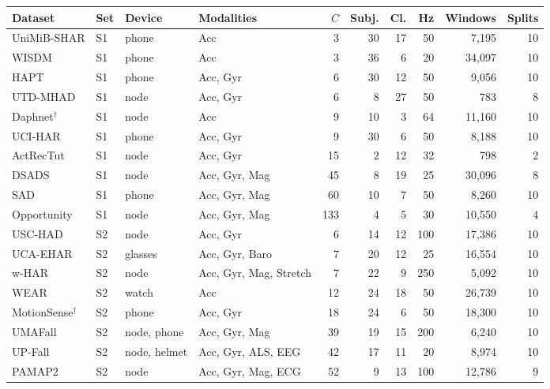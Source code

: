 \begin{tabular}{@{}llllrrrrrr@{}}
\toprule
Dataset & Set & Device & Modalities & $C$ & Subj. & Cl. & Hz & Windows & Splits \\
\midrule
UniMiB-SHAR & S1 & phone & Acc & 3 & 30 & 17 & 50 & 7,195 & 10 \\
WISDM & S1 & phone & Acc & 3 & 36 & 6 & 20 & 34,097 & 10 \\
HAPT & S1 & phone & Acc, Gyr & 6 & 30 & 12 & 50 & 9,056 & 10 \\
UTD-MHAD & S1 & node & Acc, Gyr & 6 & 8 & 27 & 50 & 783 & 8 \\
Daphnet$^\dagger$ & S1 & node & Acc & 9 & 10 & 3 & 64 & 11,160 & 10 \\
UCI-HAR & S1 & phone & Acc, Gyr & 9 & 30 & 6 & 50 & 8,188 & 10 \\
ActRecTut & S1 & node & Acc, Gyr & 15 & 2 & 12 & 32 & 798 & 2 \\
DSADS & S1 & node & Acc, Gyr, Mag & 45 & 8 & 19 & 25 & 30,096 & 8 \\
SAD & S1 & phone & Acc, Gyr, Mag & 60 & 10 & 7 & 50 & 8,260 & 10 \\
Opportunity & S1 & node & Acc, Gyr, Mag & 133 & 4 & 5 & 30 & 10,550 & 4 \\
\midrule
USC-HAD & S2 & node & Acc, Gyr & 6 & 14 & 12 & 100 & 17,386 & 10 \\
UCA-EHAR & S2 & glasses & Acc, Gyr, Baro & 7 & 20 & 12 & 25 & 16,554 & 10 \\
w-HAR & S2 & node & Acc, Gyr, Mag, Stretch & 7 & 22 & 9 & 250 & 5,092 & 10 \\
WEAR & S2 & watch & Acc & 12 & 24 & 18 & 50 & 26,739 & 10 \\
MotionSense$^\dagger$ & S2 & phone & Acc, Gyr & 18 & 24 & 6 & 50 & 18,300 & 10 \\
UMAFall & S2 & node, phone & Acc, Gyr, Mag & 39 & 19 & 15 & 200 & 6,240 & 10 \\
UP-Fall & S2 & node, helmet & Acc, Gyr, ALS, EEG & 42 & 17 & 11 & 20 & 8,974 & 10 \\
PAMAP2 & S2 & node & Acc, Gyr, Mag, ECG & 52 & 9 & 13 & 100 & 12,786 & 9 \\
\bottomrule
\end{tabular}
